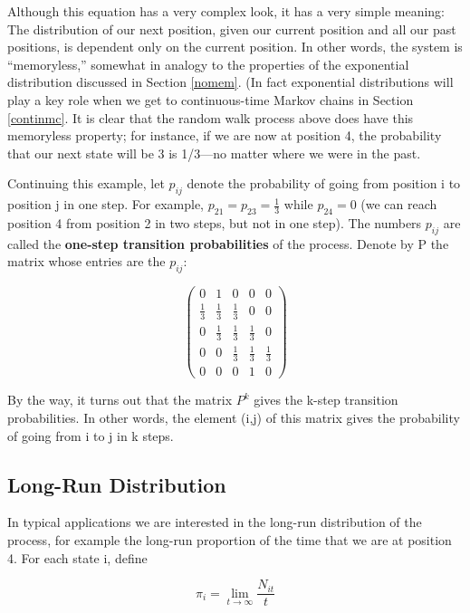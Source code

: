 Although this equation has a very complex look, it has a very simple
meaning: The distribution of our next position, given our current
position and all our past positions, is dependent only on the current
position.  In other words, the system is ``memoryless,'' somewhat in
analogy to the properties of the exponential distribution discussed in
Section \ref{nomem}.  (In fact exponential distributions will play a key
role when we get to continuous-time Markov chains in Section
\ref{continmc}.  It is clear that the random walk process above does
have this memoryless property; for instance, if we are now at position
4, the probability that our next state will be 3 is 1/3---no matter
where we were in the past.

Continuing this example, let $p_{ij}$ denote the probability of going
from position i to position j in one step. For example,
$p_{21}=p_{23}=\frac{1}{3}$ while $p_{24}=0$ (we can reach position 4
from position 2 in two steps, but not in one step). The numbers $p_{ij}$
are called the \textbf{one-step transition probabilities} of the
process. Denote by P the matrix whose entries are the $p_{ij}$:

\begin{equation} 
\label{p}
\begin{pmatrix} 
0 & 1 & 0 & 0 & 0 \\ 
\frac{1}{3} & \frac{1}{3} & \frac{1}{3} & 0 & 0 \\ 
0 & \frac{1}{3} & \frac{1}{3} & \frac{1}{3} & 0 \\
0 & 0 & \frac{1}{3} & \frac{1}{3} & \frac{1}{3} \\
0 & 0 & 0 & 1 & 0 
\end{pmatrix}
\end{equation}

By the way, it turns out that the matrix $P^{k}$ gives the k-step
transition probabilities. In other words, the element (i,j) of this
matrix gives the probability of going from i to j in k steps.

\subsection{Long-Run Distribution}
\label{discpi}

In typical applications we are interested in the long-run distribution of the
process, for example the long-run proportion of the time that we are at position
4. For each state i, define

\begin{equation}
\label{limnt}
\pi_{i}=\lim_{t\rightarrow \infty }\frac{N_{it}}{t}
\end{equation}

